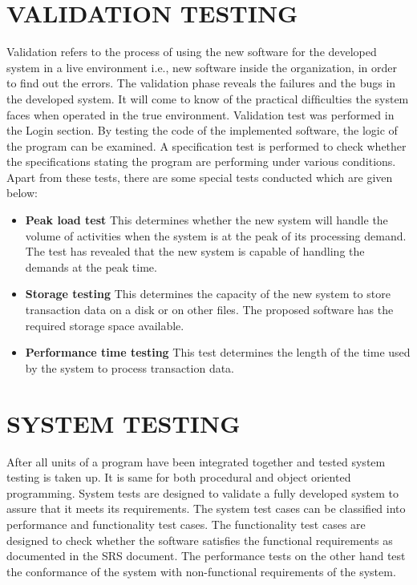 \documentclass[12pt,a4paper,oneside]{report}
\begin{document}
\section{VALIDATION TESTING}
Validation refers to the process of using the new software for the developed system in a live environment i.e., new software inside the organization, in order to ﬁnd out the errors. The validation phase reveals the failures and the bugs in the developed system. It will come to know of the practical difﬁculties the system faces when operated in the true environment. Validation test was performed in the Login section. By testing the code of the implemented software, the logic of the program can be examined. A speciﬁcation test is performed to check whether the speciﬁcations stating the program are performing under various conditions. Apart from these tests, there are some special tests conducted which are given below:
\begin{itemize}
\item \textbf{Peak load test} This determines whether the new system will handle the volume of activities when the system is at the peak of its processing demand. The test has revealed that the new system is capable of handling the demands at the peak time.
\item \textbf{ Storage testing }  This determines the capacity of the new system to store transaction data on a disk or on other ﬁles. The proposed software has the required storage space available. 
\item \textbf{ Performance time testing } This test determines the length of the time used by the system to process transaction data.
 

\end{itemize}
 \section{SYSTEM TESTING}
 \par After all units of a program have been integrated together and tested system testing is taken up. It is same for both procedural and object oriented programming. System tests are designed to validate a fully developed system to assure that it meets its requirements. The system test cases can be classiﬁed into performance and functionality test cases. The functionality test cases are designed to check whether the software satisﬁes the functional requirements as documented in the SRS document. The performance tests on the other hand test the conformance of the system with non-functional requirements of the system.
\end{document}
